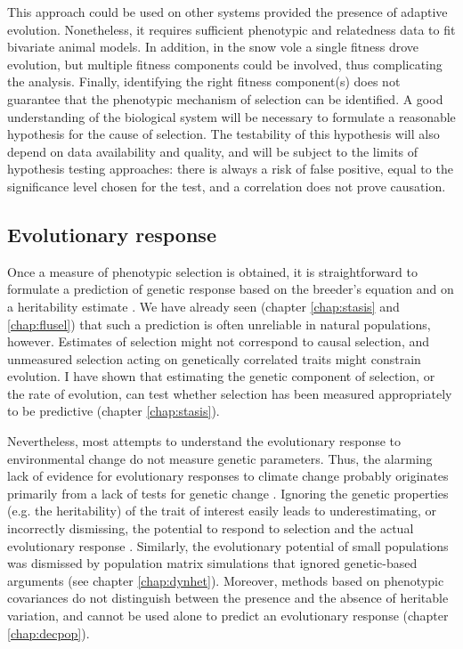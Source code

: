 This approach could be used on other systems provided the presence of adaptive evolution. Nonetheless, it requires sufficient phenotypic and relatedness data to fit bivariate animal models. In addition, in the snow vole a single fitness drove evolution, but multiple fitness components could be involved, thus complicating the analysis. Finally, identifying the right fitness component(s) does not guarantee that the phenotypic mechanism of selection can be identified. A good understanding of the biological system will be necessary to formulate a reasonable hypothesis for the cause of selection. The testability of this hypothesis will also depend on data availability and quality, and will be subject to the limits of hypothesis testing approaches: there is always a risk of false positive, equal to the significance level chosen for the test, and a correlation does not prove causation.


\subsection{Evolutionary response}
Once a measure of phenotypic selection is obtained, it is straightforward to formulate a prediction of genetic response based on the breeder's equation and on a heritability estimate \parencite{Lush1937, Falconer1996}. We have already seen (chapter \ref{chap:stasis} and \ref{chap:flusel}) that such a prediction is often unreliable in natural populations, however.  Estimates of selection might not correspond to causal selection, and unmeasured selection acting on genetically correlated traits might constrain evolution. I have shown that estimating the genetic component of selection, or the rate of evolution, can test whether selection has been measured appropriately to be predictive (chapter \ref{chap:stasis}). 

Nevertheless, most attempts to understand the evolutionary response to environmental change do not measure genetic parameters. Thus, the alarming lack of evidence for evolutionary responses to climate change probably originates primarily from a lack of tests for genetic change \parencite{Charmantier2014climate,Gienapp2014,Merila2014,Crozier2014}.
Ignoring the genetic properties (e.g. the heritability) of the trait of interest \parencite[e.g.][]{Forcada2014, Coulson2014, traill2014demography} easily leads to underestimating, or incorrectly dismissing, the potential to respond to selection and the actual evolutionary response \parencite{Nietlisbach2015, Chevin2015a, Pigeon2016}.
Similarly, the evolutionary potential of small populations was dismissed by population matrix simulations that ignored genetic-based arguments (see chapter \ref{chap:dynhet}). Moreover, methods based on phenotypic covariances do not distinguish between the presence and the absence of heritable variation, and cannot be used alone to predict an evolutionary response (chapter \ref{chap:decpop}).

